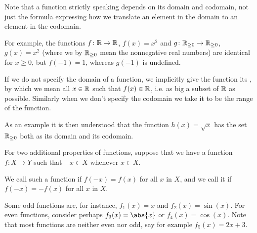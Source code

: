 \noindent
Note that a function strictly speaking depends on its domain and codomain, not just the formula expressing how we translate an element in the domain to an element in the codomain.

For example, the functions $f \colon \mathbb{R} \to \mathbb{R}$, $f(x) = x^2$ and $g \colon \mathbb{R}_{\geq 0} \to \mathbb{R}_{\geq 0}$, $g(x) = x^2$ (where we by $\mathbb{R}_{\geq 0}$ mean the nonnegative real numbers) are identical for $x \geq 0$, but $f(-1) = 1$, whereas $g(-1)$ is undefined.

If we do not specify the domain of a function, we implicitly give the function its , by which we mean all $x \in \mathbb{R}$ such that $f(x) \in \mathbb{R}$, i.e. as big a subset of $\mathbb{R}$ as possible.
Similarly when we don't specify the codomain we take it to be the range of the function.

As an example it is then understood that the function $h(x) = \sqrt{x}$ has the set $\mathbb{R}_{\geq 0}$ both as its domain and its codomain.

For two additional properties of functions, suppose that we have a function $f \colon X \to Y$ such that $-x \in X$ whenever $x \in X$.

We call such a function  if $f(-x) = f(x)$ for all $x$ in $X$, and we call it  if $f(-x) = - f(x)$ for all $x$ in $X$.

Some odd functions are, for instance, $f_1(x) = x$ and $f_2(x) = \sin(x)$. For even functions, consider perhaps $f_3(x) = \abs{x}$ or $f_4(x) = \cos(x)$.
Note that most functions are neither even nor odd, say for example $f_5(x) = 2x + 3$.
